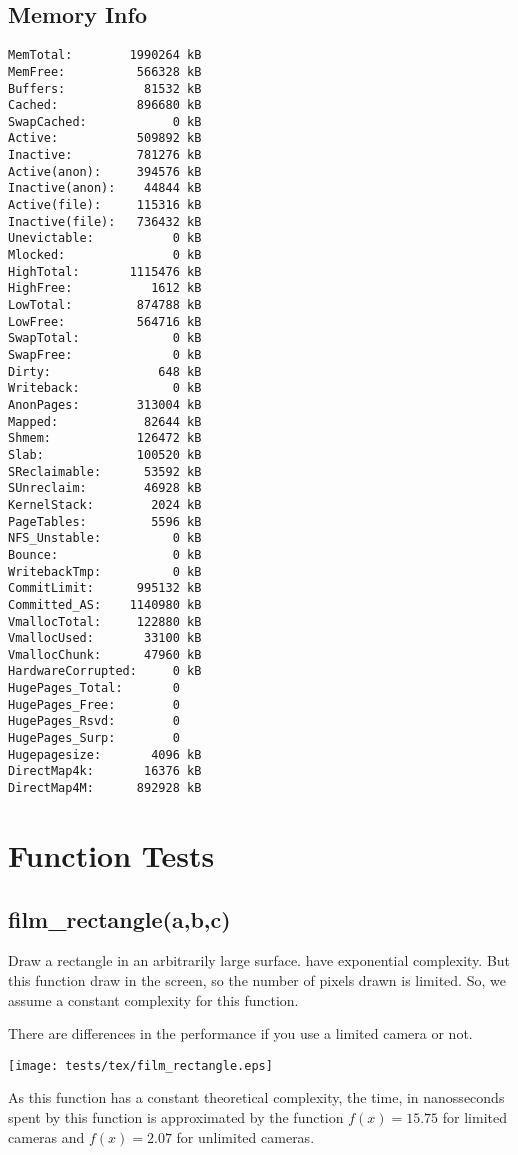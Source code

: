 \documentclass{article}
\begin{document}
\subsection{Memory Info}
\begin{verbatim}
MemTotal:        1990264 kB
MemFree:          566328 kB
Buffers:           81532 kB
Cached:           896680 kB
SwapCached:            0 kB
Active:           509892 kB
Inactive:         781276 kB
Active(anon):     394576 kB
Inactive(anon):    44844 kB
Active(file):     115316 kB
Inactive(file):   736432 kB
Unevictable:           0 kB
Mlocked:               0 kB
HighTotal:       1115476 kB
HighFree:           1612 kB
LowTotal:         874788 kB
LowFree:          564716 kB
SwapTotal:             0 kB
SwapFree:              0 kB
Dirty:               648 kB
Writeback:             0 kB
AnonPages:        313004 kB
Mapped:            82644 kB
Shmem:            126472 kB
Slab:             100520 kB
SReclaimable:      53592 kB
SUnreclaim:        46928 kB
KernelStack:        2024 kB
PageTables:         5596 kB
NFS_Unstable:          0 kB
Bounce:                0 kB
WritebackTmp:          0 kB
CommitLimit:      995132 kB
Committed_AS:    1140980 kB
VmallocTotal:     122880 kB
VmallocUsed:       33100 kB
VmallocChunk:      47960 kB
HardwareCorrupted:     0 kB
HugePages_Total:       0
HugePages_Free:        0
HugePages_Rsvd:        0
HugePages_Surp:        0
Hugepagesize:       4096 kB
DirectMap4k:       16376 kB
DirectMap4M:      892928 kB
\end{verbatim}
\section{Function Tests}
\subsection{film\_rectangle(a,b,c)}
Draw a rectangle in an arbitrarily large surface.
have exponential complexity. But this function
draw in the screen, so the number of pixels drawn
is limited. So, we assume a constant complexity
for this function.

There are differences in the performance if you use
a limited camera or not.

\texttt{[image: tests/tex/film\_rectangle.eps]}

As this function has a constant
theoretical complexity, the time, in nanosseconds
spent by this function is 
approximated by the function $f(x)=15.75$
for limited cameras and $f(x)=2.07$ for
unlimited cameras.
\end{document}
